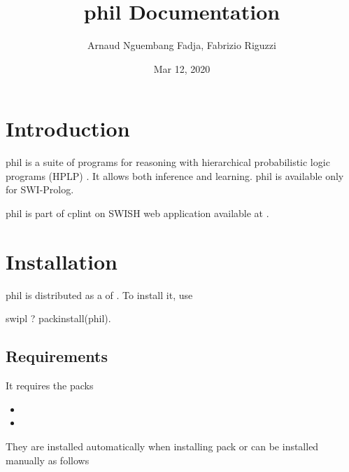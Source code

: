 \documentclass[letterpaper,10pt,english]{sphinxmanual}
\title{phil Documentation}
\date{Mar 12, 2020}
\author{Arnaud Nguembang Fadja, Fabrizio Riguzzi}
\begin{document}
\maketitle
\sphinxtableofcontents
{}\label{\detokenize{index::doc}}



\chapter{Introduction}
\label{\detokenize{index:phil-on-swish-manual-swi-prolog-version}}\label{\detokenize{index:introduction}}
phil is a suite of programs for reasoning with hierarchical probabilistic logic programs (HPLP) \label{\detokenize{index:id1}}{\hyperref[\detokenize{index:ngulamrig17-plp-iw}]{\sphinxcrossref{{[}NguembangFadjaLR17{]}}}}.
It allows both inference and learning. phil is available only for SWI-Prolog.

phil is part of cplint on SWISH web application available at .


\chapter{Installation}
\label{\detokenize{index:installation}}
phil is distributed as a  of .
To install it, use

%
\begin{sphinxVerbatim}[commandchars=\\\{\}]
\PYGZdl{} swipl
?\PYGZhy{} pack\PYGZus{}install(phil).
\end{sphinxVerbatim}


\section{Requirements}
\label{\detokenize{index:requirements}}
It requires the packs
\begin{itemize}
\item {} 

\item {} 

\end{itemize}

They are installed automatically when installing pack  or can be installed manually as follows
\end{document}
